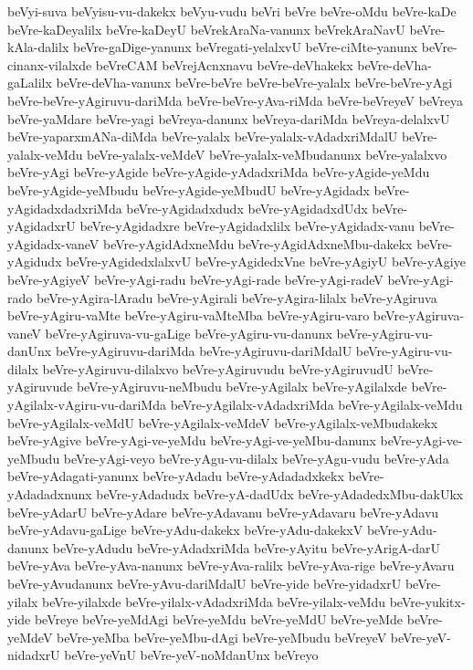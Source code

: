{beVyi-suva
beVyisu-vu-dakekx
beVyu-vudu
beVri
beVre
beVre-oMdu
beVre-kaDe
beVre-kaDeyalilx
beVre-kaDeyU
beVrekAraNa-vanunx
beVrekAraNavU
beVre-kAla-dalilx
beVre-gaDige-yanunx
beVregati-yelalxvU
beVre-ciMte-yanunx
beVre-cinanx-vilalxde
beVreCAM
beVrejAcnxnavu
beVre-deVhakekx
beVre-deVha-gaLalilx
beVre-deVha-vanunx
beVre-beVre
beVre-beVre-yalalx
beVre-beVre-yAgi
beVre-beVre-yAgiruvu-dariMda
beVre-beVre-yAva-riMda
beVre-beVreyeV
beVreya
beVre-yaMdare
beVre-yagi
beVreya-danunx
beVreya-dariMda
beVreya-delalxvU
beVre-yaparxmANa-diMda
beVre-yalalx
beVre-yalalx-vAdadxriMdalU
beVre-yalalx-veMdu
beVre-yalalx-veMdeV
beVre-yalalx-veMbudanunx
beVre-yalalxvo
beVre-yAgi
beVre-yAgide
beVre-yAgide-yAdadxriMda
beVre-yAgide-yeMdu
beVre-yAgide-yeMbudu
beVre-yAgide-yeMbudU
beVre-yAgidadx
beVre-yAgidadxdadxriMda
beVre-yAgidadxdudx
beVre-yAgidadxdUdx
beVre-yAgidadxrU
beVre-yAgidadxre
beVre-yAgidadxlilx
beVre-yAgidadx-vanu
beVre-yAgidadx-vaneV
beVre-yAgidAdxneMdu
beVre-yAgidAdxneMbu-dakekx
beVre-yAgidudx
beVre-yAgidedxlalxvU
beVre-yAgidedxVne
beVre-yAgiyU
beVre-yAgiye
beVre-yAgiyeV
beVre-yAgi-radu
beVre-yAgi-rade
beVre-yAgi-radeV
beVre-yAgi-rado
beVre-yAgira-lAradu
beVre-yAgirali
beVre-yAgira-lilalx
beVre-yAgiruva
beVre-yAgiru-vaMte
beVre-yAgiru-vaMteMba
beVre-yAgiru-varo
beVre-yAgiruva-vaneV
beVre-yAgiruva-vu-gaLige
beVre-yAgiru-vu-danunx
beVre-yAgiru-vu-danUnx
beVre-yAgiruvu-dariMda
beVre-yAgiruvu-dariMdalU
beVre-yAgiru-vu-dilalx
beVre-yAgiruvu-dilalxvo
beVre-yAgiruvudu
beVre-yAgiruvudU
beVre-yAgiruvude
beVre-yAgiruvu-neMbudu
beVre-yAgilalx
beVre-yAgilalxde
beVre-yAgilalx-vAgiru-vu-dariMda
beVre-yAgilalx-vAdadxriMda
beVre-yAgilalx-veMdu
beVre-yAgilalx-veMdU
beVre-yAgilalx-veMdeV
beVre-yAgilalx-veMbudakekx
beVre-yAgive
beVre-yAgi-ve-yeMdu
beVre-yAgi-ve-yeMbu-danunx
beVre-yAgi-ve-yeMbudu
beVre-yAgi-veyo
beVre-yAgu-vu-dilalx
beVre-yAgu-vudu
beVre-yAda
beVre-yAdagati-yanunx
beVre-yAdadu
beVre-yAdadadxkekx
beVre-yAdadadxnunx
beVre-yAdadudx
beVre-yA-dadUdx
beVre-yAdadedxMbu-dakUkx
beVre-yAdarU
beVre-yAdare
beVre-yAdavanu
beVre-yAdavaru
beVre-yAdavu
beVre-yAdavu-gaLige
beVre-yAdu-dakekx
beVre-yAdu-dakekxV
beVre-yAdu-danunx
beVre-yAdudu
beVre-yAdadxriMda
beVre-yAyitu
beVre-yArigA-darU
beVre-yAva
beVre-yAva-nanunx
beVre-yAva-ralilx
beVre-yAva-rige
beVre-yAvaru
beVre-yAvudanunx
beVre-yAvu-dariMdalU
beVre-yide
beVre-yidadxrU
beVre-yilalx
beVre-yilalxde
beVre-yilalx-vAdadxriMda
beVre-yilalx-veMdu
beVre-yukitx-yide
beVreye
beVre-yeMdAgi
beVre-yeMdu
beVre-yeMdU
beVre-yeMde
beVre-yeMdeV
beVre-yeMba
beVre-yeMbu-dAgi
beVre-yeMbudu
beVreyeV
beVre-yeV-nidadxrU
beVre-yeVnU
beVre-yeV-noMdanUnx
beVreyo
}
